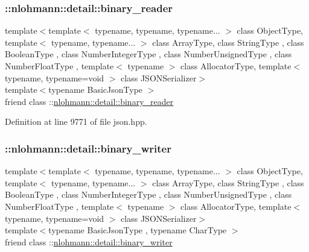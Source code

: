 \subsubsection{\texorpdfstring{\+::nlohmann\+::detail\+::binary\+\_\+reader}{::nlohmann::detail::binary\_reader}}
{\footnotesize\ttfamily template$<$template$<$ typename, typename, typename... $>$ class Object\+Type, template$<$ typename, typename... $>$ class Array\+Type, class String\+Type , class Boolean\+Type , class Number\+Integer\+Type , class Number\+Unsigned\+Type , class Number\+Float\+Type , template$<$ typename $>$ class Allocator\+Type, template$<$ typename, typename=void $>$ class J\+S\+O\+N\+Serializer$>$ \\
template$<$typename Basic\+Json\+Type $>$ \\
friend class \+::\hyperlink{classnlohmann_1_1detail_1_1binary__reader}{nlohmann\+::detail\+::binary\+\_\+reader}\hspace{0.3cm}{\ttfamily [friend]}}



Definition at line 9771 of file json.\+hpp.

\mbox{\label{classnlohmann_1_1basic__json_a69d491bbda88ade6d3c7a2b11309e8bf}} 
\subsubsection{\texorpdfstring{\+::nlohmann\+::detail\+::binary\+\_\+writer}{::nlohmann::detail::binary\_writer}}
{\footnotesize\ttfamily template$<$template$<$ typename, typename, typename... $>$ class Object\+Type, template$<$ typename, typename... $>$ class Array\+Type, class String\+Type , class Boolean\+Type , class Number\+Integer\+Type , class Number\+Unsigned\+Type , class Number\+Float\+Type , template$<$ typename $>$ class Allocator\+Type, template$<$ typename, typename=void $>$ class J\+S\+O\+N\+Serializer$>$ \\
template$<$typename Basic\+Json\+Type , typename Char\+Type $>$ \\
friend class \+::\hyperlink{classnlohmann_1_1detail_1_1binary__writer}{nlohmann\+::detail\+::binary\+\_\+writer}\hspace{0.3cm}{\ttfamily [friend]}}



